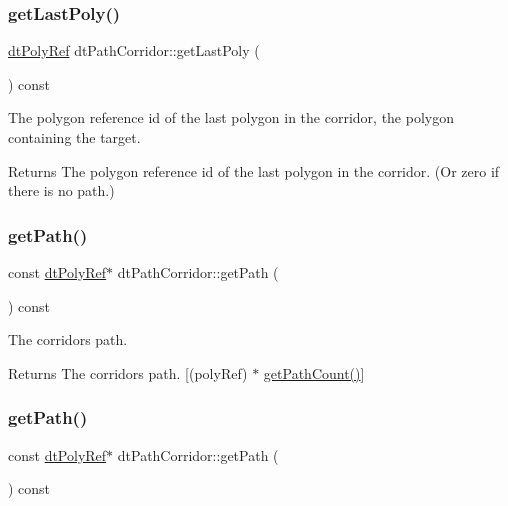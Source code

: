 \subsubsection{\texorpdfstring{get\+Last\+Poly()}{getLastPoly()}\hspace{0.1cm}{\footnotesize\ttfamily [2/2]}}
{\footnotesize\ttfamily \hyperlink{group__detour_gab4e0b2257a670c1a800057999612b466}{dt\+Poly\+Ref} dt\+Path\+Corridor\+::get\+Last\+Poly (\begin{DoxyParamCaption}{ }\end{DoxyParamCaption}) const\hspace{0.3cm}{\ttfamily [inline]}}

The polygon reference id of the last polygon in the corridor, the polygon containing the target. \begin{DoxyReturn}{Returns}
The polygon reference id of the last polygon in the corridor. (Or zero if there is no path.) 
\end{DoxyReturn}
\mbox{\label{classdtPathCorridor_adc4aee4a1867ce60e6b319edc686661f}} 
\subsubsection{\texorpdfstring{get\+Path()}{getPath()}\hspace{0.1cm}{\footnotesize\ttfamily [1/2]}}
{\footnotesize\ttfamily const \hyperlink{group__detour_gab4e0b2257a670c1a800057999612b466}{dt\+Poly\+Ref}$\ast$ dt\+Path\+Corridor\+::get\+Path (\begin{DoxyParamCaption}{ }\end{DoxyParamCaption}) const\hspace{0.3cm}{\ttfamily [inline]}}

The corridor\textquotesingle{}s path. \begin{DoxyReturn}{Returns}
The corridor\textquotesingle{}s path. \mbox{[}(poly\+Ref) $\ast$ \hyperlink{classdtPathCorridor_a16bfdb275fb8f385c269cd06236f8213}{get\+Path\+Count()}\mbox{]} 
\end{DoxyReturn}
\mbox{\label{classdtPathCorridor_adc4aee4a1867ce60e6b319edc686661f}} 
\subsubsection{\texorpdfstring{get\+Path()}{getPath()}\hspace{0.1cm}{\footnotesize\ttfamily [2/2]}}
{\footnotesize\ttfamily const \hyperlink{group__detour_gab4e0b2257a670c1a800057999612b466}{dt\+Poly\+Ref}$\ast$ dt\+Path\+Corridor\+::get\+Path (\begin{DoxyParamCaption}{ }\end{DoxyParamCaption}) const\hspace{0.3cm}{\ttfamily [inline]}}

